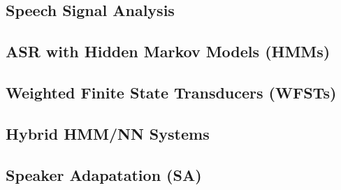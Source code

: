\documentclass[9pt]{extarticle}
\begin{document}
  \begin{multicols}{2}
  \subsection*{Speech Signal Analysis}
  
  \subsection*{ASR with Hidden Markov Models (HMMs)}
  
  \subsection*{Weighted Finite State Transducers (WFSTs)}
  
  \subsection*{Hybrid HMM/NN Systems}
  
  \subsection*{Speaker Adapatation (SA)}
  
  \end{multicols}
\end{document}
